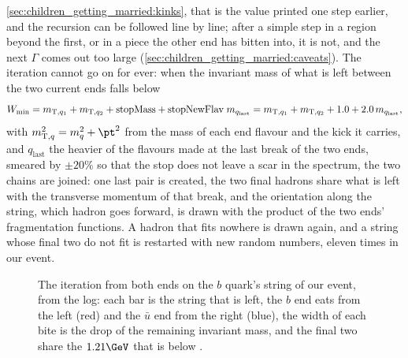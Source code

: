 \cref{sec:children_getting_married:kinks}, that is the value printed one
step earlier, and the recursion can be followed line by line; after a
simple step in a region beyond the first, or in a piece the other end has
bitten into, it is not, and the next $\Gamma$ comes out too large
(\cref{sec:children_getting_married:caveats}). The iteration cannot go on
for ever: when the
invariant mass of what is left between the two current ends falls below
\begin{equation}
  W_{\min}=m_{\mathrm{T},q_1}+m_{\mathrm{T},q_2}+\mathrm{stopMass}+\mathrm{stopNewFlav}\;m_{q_{\mathrm{last}}}
  =m_{\mathrm{T},q_1}+m_{\mathrm{T},q_2}+1.0+2.0\,m_{q_{\mathrm{last}}},
  \label{eq:children_getting_married:wmin}
\end{equation}
with $m_{\mathrm{T},q}^2=m_q^2+\pt^2$ from the mass of each end flavour
and the kick it carries, and $q_{\mathrm{last}}$ the heavier of the
flavours made at the last break of the two ends,
smeared by $\pm20\%$ so that the stop does not leave a scar in the
spectrum, the two chains are joined: one last pair is created, the two
final hadrons share what is left with the transverse momentum of that
break, and the orientation along the string, which hadron goes forward, is
drawn with the product of the two ends' fragmentation functions. A hadron
that fits nowhere is drawn again, and a string whose final two do not fit
is restarted with new random numbers, eleven times in our event.

\begin{figure}[htbp]\centering
\resizebox{\textwidth}{!}{}
\caption[The iteration from both ends on the $b$ quark's string]{The
iteration from both ends on the $b$ quark's string of our event, from the
 log: each bar is the string that is left, the $b$ end eats from
the left (red) and the $\bar u$ end from the right (blue), the width of each
bite is the drop of the remaining invariant mass, and the final two share
the $1.21\GeV$ that is below \Wmin.}
\label{fig:children_getting_married:iteration_sketch}
\end{figure}

